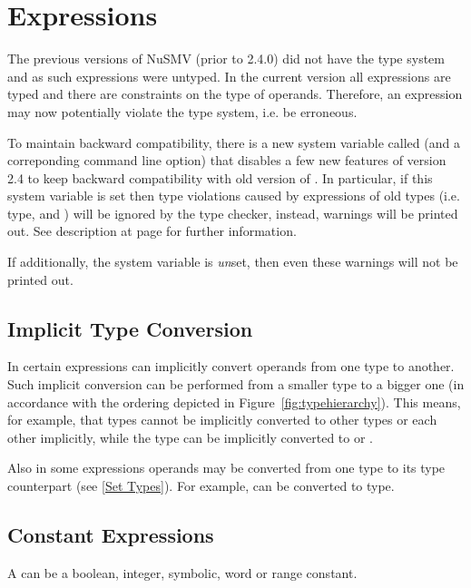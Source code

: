 
\section{Expressions}
\label{Expressions}
%

The previous versions of NuSMV (prior to 2.4.0) did not have the type
system and as such expressions were untyped. 
%
In the current version all expressions are typed and there are
constraints on the type of operands. 
%
Therefore, an expression may now potentially violate the type system,
i.e. be erroneous.

To maintain backward compatibility, there is a new system variable
called  (and a correponding 
command line option) that disables a few new features of version 2.4
to keep backward compatibility with old version of
\nusmv. In particular, if this system variable is set then type violations 
caused by expressions of old types (i.e. \Enum type, \Boolean and
\Integer) will be ignored by the type checker, instead, warnings will
be printed out. See description at page
\pageref{ref::backwardcompatibility} for further information.

If additionally, the system variable
 is
\emph{un}set, then even these warnings will not be printed out.

\subsection{Implicit Type Conversion}
\label{Implicit Type Conversion}

In certain expressions \nusmv can implicitly convert operands from one
type to another. 
%
Such implicit conversion can be performed from a smaller type to a
bigger one (in accordance with the ordering depicted in
Figure~\ref{fig:typehierarchy}).
%
This means, for example, that \Word types cannot be implicitly
converted to other types or each other implicitly, while the type
\Boolean can be implicitly converted to \Integer or \IntSymbEnum.

Also in some expressions operands may be converted from one type to
its \Set type counterpart (see \ref{Set Types}). For example, \Integer
can be converted to \IntSet type.

\subsection{Constant Expressions}
\label{Constant Expressions}
%
%
A  can be a boolean,
integer, symbolic, word or range constant.

